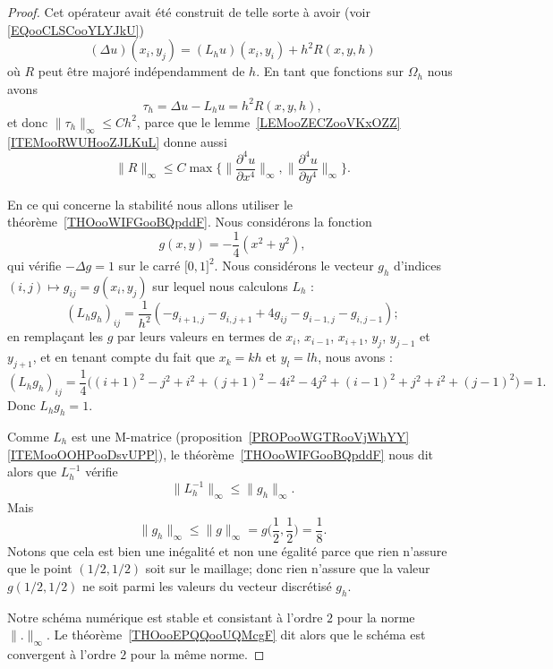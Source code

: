 \begin{proof}
	Cet opérateur avait été construit de telle sorte à avoir (voir \eqref{EQooCLSCooYLYJkU})
	\begin{equation}
		(\Delta u)(x_i,y_j)=(L_hu)(x_i,y_i)+h^2R(x,y,h)
	\end{equation}
	où \( R\) peut être majoré indépendamment de \( h\). En tant que fonctions sur \( \Omega_h\) nous avons
	\begin{equation}
		\tau_h=\Delta u-L_hu=h^2R(x,y,h),
	\end{equation}
	et donc \( \| \tau_h \|_{\infty}\leq Ch^2\), parce que le lemme~\ref{LEMooZECZooVKxOZZ}\ref{ITEMooRWUHooZJLKuL} donne aussi
	\begin{equation}
		\| R \|_{\infty}\leq C\max\{ \| \frac{ \partial^4u }{ \partial x^4 } \|_{\infty},\| \frac{ \partial^4u }{ \partial y^4 } \|_{\infty} \}.
	\end{equation}

	En ce qui concerne la stabilité nous allons utiliser le théorème~\ref{THOooWIFGooBQpddF}. Nous considérons la fonction
	\begin{equation}
		g(x,y)=-\frac{1}{ 4 }(x^2+y^2),
	\end{equation}
	qui vérifie \( -\Delta g=1\) sur le carré \( \mathopen[ 0 , 1 \mathclose]^2\). Nous considérons le vecteur \( g_h\) d'indices \( (i,j)\mapsto g_{ij}=g(x_i,y_j)\) sur lequel nous calculons \( L_h\) :
	\begin{equation}
		(L_hg_h)_{ij}=\frac{1}{ h^2 }(-g_{i+1,j}-g_{i,j+1}+4g_{ij}-g_{i-1,j}-g_{i,j-1});
	\end{equation}
	en remplaçant les \( g\) par leurs valeurs en termes de \( x_i\), \( x_{i-1}\), \( x_{i+1}\), \( y_j\), \( y_{j-1}\) et \( y_{j+1}\), et en tenant compte du fait que \( x_k=kh\) et \( y_l=lh\), nous avons :
	\begin{equation}
		(L_hg_h)_{ij}=\frac{1}{ 4 }\big( (i+1)^2-j^2+i^2+(j+1)^2-4i^2-4j^2+(i-1)^2+j^2+i^2+(j-1)^2 \big)=1.
	\end{equation}
	Donc \( L_hg_h=1\).

	Comme \( L_h\) est une M-matrice (proposition~\ref{PROPooWGTRooVjWhYY}\ref{ITEMooOOHPooDsvUPP}), le théorème~\ref{THOooWIFGooBQpddF} nous dit alors que \( L_h^{-1}\) vérifie
	\begin{equation}
		\| L_h^{-1} \|_{\infty}\leq \| g_h \|_{\infty}.
	\end{equation}
	Mais
	\begin{equation}
		\| g_h \|_{\infty}\leq \| g \|_{\infty}=g\big( \frac{ 1 }{2},\frac{ 1 }{2} \big)=\frac{1}{ 8 }.
	\end{equation}
	Notons que cela est bien une inégalité et non une égalité parce que rien n'assure que le point \( (1/2,1/2)\) soit sur le maillage; donc rien n'assure que la valeur \( g(1/2,1/2)\) ne soit parmi les valeurs du vecteur discrétisé \( g_h\).

	Notre schéma numérique est stable et consistant à l'ordre \( 2\) pour la norme \( \| . \|_{\infty}\). Le théorème~\ref{THOooEPQQooUQMcgF} dit alors que le schéma est convergent à l'ordre \( 2\) pour la même norme.
\end{proof}

